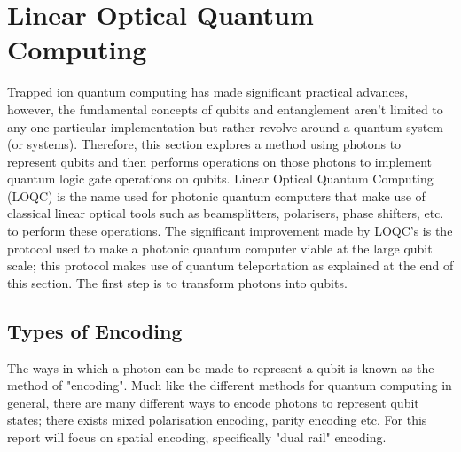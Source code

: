 
\section{Linear Optical Quantum Computing}\label{sec:Photonic}
Trapped ion quantum computing has made significant practical advances, however, the fundamental concepts of qubits and entanglement aren't limited to any one particular implementation but rather revolve around a quantum system (or systems). Therefore, this section explores a method using photons to represent qubits and then performs operations on those photons to implement quantum logic gate operations on qubits. Linear Optical Quantum Computing (LOQC) is the name used for photonic quantum computers that make use of classical linear optical tools such as beamsplitters, polarisers, phase shifters, etc. to perform these operations. The significant improvement made by LOQC's is the protocol used to make a photonic quantum computer viable at the large qubit scale; this protocol makes use of quantum teleportation as explained at the end of this section. The first step is to transform photons into qubits.

\subsection{Types of Encoding}
The ways in which a photon can be made to represent a qubit is known as the method of "encoding". Much like the different methods for quantum computing in general, there are many different ways to encode photons to represent qubit states; there exists mixed polarisation encoding, parity encoding etc. For this report will focus on spatial encoding, specifically "dual rail" encoding. 

